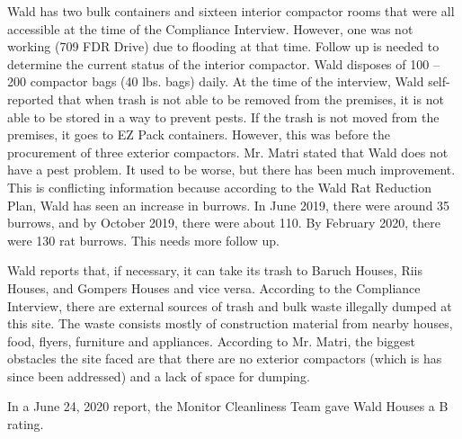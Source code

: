 Wald has two bulk containers and sixteen interior compactor rooms that were all accessible at the time of the Compliance Interview. However, one was not working (709 FDR Drive) due to flooding at that time. Follow up is needed to determine the current status of the interior compactor. Wald disposes of 100 -- 200 compactor bags (40 lbs. bags) daily. At the time of the interview, Wald self-reported that when trash is not able to be removed from the premises, it is not able to be stored in a way to prevent pests. If the trash is not moved from the premises, it goes to EZ Pack containers. However, this was before the procurement of three exterior compactors. Mr. Matri stated that Wald does not have a pest problem. It used to be worse, but there has been much improvement. This is conflicting information because according to the Wald Rat Reduction Plan, Wald has seen an increase in burrows.  In June 2019, there were around 35 burrows, and by October 2019, there were about 110. By February 2020, there were 130 rat burrows. This needs more follow up.

Wald reports that, if necessary, it can take its trash to Baruch Houses, Riis Houses, and Gompers Houses and vice versa. According to the Compliance Interview, there are external sources of trash and bulk waste illegally dumped at this site. The waste consists mostly of construction material from nearby houses, food, flyers, furniture and appliances. According to Mr. Matri, the biggest obstacles the site faced are that there are no exterior compactors (which is has since been addressed) and a lack of space for dumping.

 

In a June 24, 2020 report, the Monitor Cleanliness Team gave Wald Houses a B rating.  

 
